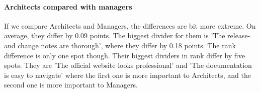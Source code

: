 \documentclass{article}
\begin{document}
\paragraph{Architects compared with managers}

If we compare Architects and Managers, the differences are bit more
extreme. On average, they differ by 0.09 points. The biggest divider for
them is 'The release- and change notes are thorough', where they differ
by 0.18 points. The rank difference is only one spot though. Their
biggest dividers in rank differ by five spots. They are 'The official
website looks professional' and 'The documentation is easy to navigate'
where the first one is more important to Architects, and the second one
is more important to Managers.

\begin{table}[H]
\centering
\begin{tabularx}{\columnwidth}{X|c:c|c:c|c}


\end{tabularx}
\end{table}
\end{document}
